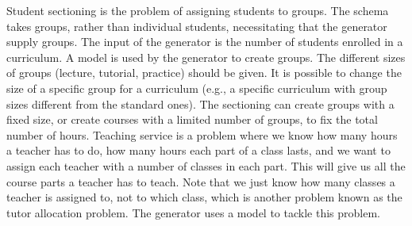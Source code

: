 


Student sectioning is the problem of assigning students to groups.
The \UTP{} schema takes groups, rather than individual students, necessitating that the generator supply groups.
%
The input of the generator is the number of students enrolled in a curriculum.
A \CSP{} model is used by the generator to create groups.
The different sizes of groups (lecture, tutorial, practice) should be given.
It is possible to change the size of a specific group for a curriculum (e.g., a specific curriculum with group sizes different from the standard ones).
%
The sectioning \CSP{} can create groups with a fixed size, or create courses with a limited number of groups, to fix the total number of hours. 
%
Teaching service is a problem where we know how many hours a teacher has to do, how many hours each part of a class lasts, and we want to assign each teacher with a number of classes in each part.
This will give us all the course parts a teacher has to teach. %
Note that we just know how many classes a teacher is assigned to, not to which class, which is another problem
known as the tutor allocation problem.
%
The generator uses a \CSP{} model to tackle this problem.

